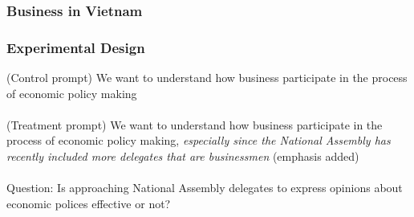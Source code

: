 \documentclass{beamer}
\begin{document}
\begin{frame}
\frametitle{Business in Vietnam}
\end{frame}

\begin{frame}
\frametitle{Experimental Design}

(Control prompt) We want to understand how business participate in the process of economic policy making\\~\\

(Treatment prompt) We want to understand how business participate in the process of economic policy making, \textit{especially since the National Assembly has recently included more delegates that are businessmen} (emphasis added)\\~\\

Question: Is approaching National Assembly delegates to express opinions about economic polices effective or not?

\end{frame}
\end{document}
